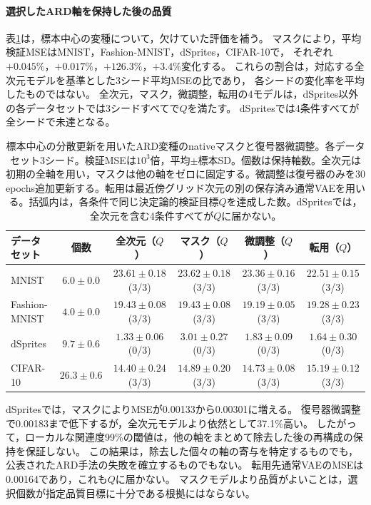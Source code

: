 \documentclass[11pt,a4paper]{ltjsarticle}
\begin{document}
\paragraph{選択したARD軸を保持した後の品質}
表\ref{tab:ardpruned}は，標本中心の変種について，欠けていた評価を補う。
マスクにより，平均検証MSEはMNIST，Fashion-MNIST，dSprites，CIFAR-10で，
それぞれ$+0.045\%$，$+0.017\%$，$+126.3\%$，$+3.4\%$変化する。
これらの割合は，対応する全次元モデルを基準とした3シード平均MSEの比であり，
各シードの変化率を平均したものではない。
全次元，マスク，微調整，転用の4モデルは，dSprites以外の各データセットでは3シードすべてで$Q$を満たす。
dSpritesでは4条件すべてが全シードで未達となる。
\begin{table}[H]
\caption{標本中心の分散更新を用いたARD変種のnativeマスクと復号器微調整。各データセット3シード。検証MSEは$10^3$倍，平均$\pm$標本SD。個数は保持軸数。全次元は初期の全軸を用い，マスクは他の軸をゼロに固定する。微調整は復号器のみを30 epochs追加更新する。転用は最近傍グリッド次元の別の保存済み通常VAEを用いる。括弧内は，各条件で同じ決定論的検証目標$Q$を達成した数。dSpritesでは，全次元を含む4条件すべてが$Q$に届かない。}\label{tab:ardpruned}
\footnotesize
\setlength{\tabcolsep}{3pt}
\begin{tabular*}{\textwidth}{@{\extracolsep{\fill}}lccccc@{}}
\toprule
データセット & 個数 & 全次元（$Q$） & マスク（$Q$） & 微調整（$Q$） & 転用（$Q$） \\
\midrule
MNIST & $6.0 \pm 0.0$ & $23.61 \pm 0.18$ (3/3) & $23.62 \pm 0.18$ (3/3) & $23.36 \pm 0.16$ (3/3) & $22.51 \pm 0.15$ (3/3) \\
Fashion-MNIST & $4.0 \pm 0.0$ & $19.43 \pm 0.08$ (3/3) & $19.43 \pm 0.08$ (3/3) & $19.19 \pm 0.05$ (3/3) & $19.28 \pm 0.23$ (3/3) \\
dSprites & $9.7 \pm 0.6$ & $1.33 \pm 0.06$ (0/3) & $3.01 \pm 0.27$ (0/3) & $1.83 \pm 0.09$ (0/3) & $1.64 \pm 0.30$ (0/3) \\
CIFAR-10 & $26.3 \pm 0.6$ & $14.40 \pm 0.24$ (3/3) & $14.89 \pm 0.20$ (3/3) & $14.73 \pm 0.08$ (3/3) & $15.19 \pm 0.12$ (3/3) \\
\bottomrule\end{tabular*}
\end{table}

dSpritesでは，マスクによりMSEが0.00133から0.00301に増える。
復号器微調整で0.00183まで低下するが，全次元モデルより依然として37.1\%高い。
したがって，ローカルな関連度99\%の閾値は，他の軸をまとめて除去した後の再構成の保持を保証しない。
この結果は，除去した個々の軸の寄与を特定するものでも，公表されたARD手法の失敗を確立するものでもない。
転用先通常VAEのMSEは0.00164であり，これも$Q$に届かない。
マスクモデルより品質がよいことは，選択個数が指定品質目標に十分である根拠にはならない。
\end{document}
